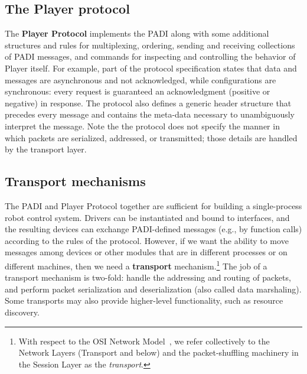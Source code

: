 \subsection{The Player protocol}
The {\bf Player Protocol} implements the PADI along with some additional
structures and rules for multiplexing, ordering, sending and receiving
collections of PADI messages, and commands for inspecting and controlling
the behavior of Player itself.  For example, part of the protocol
specification states that data and messages are asynchronous and not
acknowledged, while configurations are synchronous: every request is
guaranteed an acknowledgment (positive or negative) in response.  The
protocol also defines a generic header structure that precedes every
message and contains the meta-data necessary to unambiguously interpret the
message.  Note the the protocol does not specify the manner in which
packets are serialized, addressed, or transmitted; those details are
handled by the transport layer.

\subsection{Transport mechanisms}

The PADI and Player Protocol together are sufficient for building a
single-process robot control system.  Drivers can be instantiated and bound
to interfaces, and the resulting devices can exchange PADI-defined messages
(e.g., by function calls) according to the rules of the protocol.  However,
if we want the ability to move messages among devices or other modules that
are in different processes or on different machines, then we need a {\bf
transport} mechanism.\footnote{With respect to the OSI Network
Model~\cite{32_TannenbaumNetworks}, we refer collectively to the Network
Layers (Transport and below) and the packet-shuffling machinery in the
Session Layer as the {\em transport}.} The job of a transport mechanism is
two-fold: handle the addressing and routing of packets, and perform packet
serialization and deserialization (also called data marshaling).  Some
transports may also provide higher-level functionality, such as resource
discovery.

